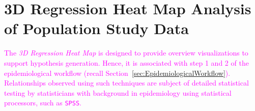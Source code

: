 \documentclass[journal]{style/vgtc} 			          %
\newcommand{\design}[1]{\textcolor{orange}{#1}}
\newcommand{\magenta}[1]{\textcolor{magenta}{#1}}
\begin{document}
\section{3D Regression Heat Map Analysis of Population Study Data}
\magenta{
The \emph{3D Regression Heat Map} is designed to provide overview visualizations to support hypothesis generation.
Hence, it is associated with step 1 and 2 of the epidemiological workflow (recall Section~\ref{sec:EpidemiologicalWorkflow}).
Relationships observed using such techniques are subject of detailed statistical testing by statisticians with background in epidemiology using statistical processors, such as \texttt{SPSS}.
}
\end{document}
